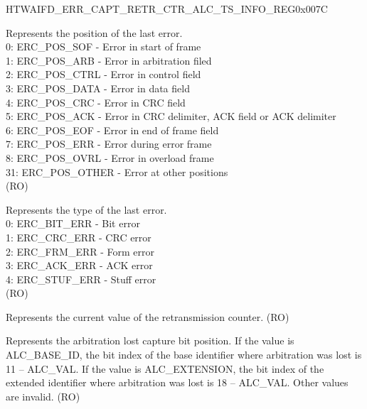\begin{register}{H}{TWAIFD\_ERR\_CAPT\_RETR\_CTR\_ALC\_TS\_INFO\_REG}{0x007C}\label{regdesc:TWAIFDERRCAPTRETRCTRALCTSINFOREG}
%
%
%
%
%
%
%
%
\regnewline%
\begin{regdesc}\begin{reglist}
\label{fielddesc:TWAIFDERRPOS}\item [TWAIFD\_ERR\_POS] Represents the position of the last error.\\
0: ERC\_POS\_SOF - Error in start of frame\\
1: ERC\_POS\_ARB - Error in arbitration filed\\
2: ERC\_POS\_CTRL - Error in control field\\
3: ERC\_POS\_DATA - Error in data field\\
4: ERC\_POS\_CRC - Error in CRC field\\
5: ERC\_POS\_ACK - Error in CRC delimiter, ACK field or ACK delimiter\\
6: ERC\_POS\_EOF - Error in end of frame field\\
7: ERC\_POS\_ERR - Error during error frame\\
8: ERC\_POS\_OVRL - Error in overload frame\\
31: ERC\_POS\_OTHER - Error at other positions\\(RO)
\label{fielddesc:TWAIFDERRTYPE}\item [TWAIFD\_ERR\_TYPE] Represents the type of the last error.\\
0: ERC\_BIT\_ERR - Bit error\\
1: ERC\_CRC\_ERR - CRC error\\
2: ERC\_FRM\_ERR - Form error\\
3: ERC\_ACK\_ERR - ACK error\\
4: ERC\_STUF\_ERR - Stuff error \\(RO)
\label{fielddesc:TWAIFDRETRCTRVAL}\item [TWAIFD\_RETR\_CTR\_VAL] Represents the current value of the retransmission counter. (RO)
\label{fielddesc:TWAIFDALCBIT}\item [TWAIFD\_ALC\_BIT] Represents the arbitration lost capture bit position. If the value is ALC\_BASE\_ID, the bit index of the base identifier where arbitration was lost is 11 – ALC\_VAL. If the value is ALC\_EXTENSION, the bit index of the extended identifier where arbitration was lost is 18 – ALC\_VAL. Other values are invalid. (RO)

\end{reglist}
\end{regdesc}
\end{register}
